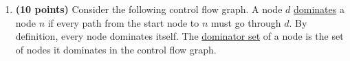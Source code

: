 \documentclass[11pt]{article} %
\begin{document}
\begin{enumerate}
\newpage


\item {\bf (10 points)}
Consider the following control flow graph.
A node $d$ {\underline{dominates}} a node $n$ if every path from the start node to $n$ must go through $d$. By definition, every node dominates itself. The {\underline{dominator set}} of a node is the set of nodes it dominates in the control flow graph.
\begin{center}
~~~~~~~~~~~~~~~~~~~~~~~~~~
\begin{minipage}{4in}
\end{minipage}
\end{center}


\end{enumerate}
\end{document}
